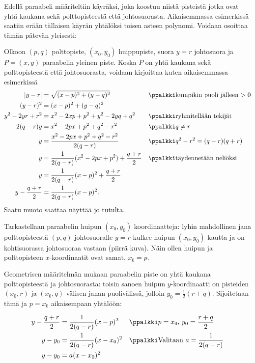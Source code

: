 Edellä paraabeli määriteltiin käyräksi, joka koostuu niistä pisteistä jotka ovat yhtä kaukana sekä polttopisteestä että johtosuorasta. Aikaisemmassa esimerkissä saatiin erään tällaisen käyrän yhtälöksi toisen asteen polynomi. Voidaan osoittaa tämän pätevän yleisesti:

Olkoon $(p,q)$ polttopiste, $(x_0, y_0)$ huippupiste, suora $y = r$ johtosuora ja $P=(x, y)$ paraabelin yleinen piste. Koska $P$ on yhtä kaukana sekä polttopisteestä että johtosuorasta, voidaan kirjoittaa kuten aikaisemmassa esimerkissä
\begin{align*}
|y-r| & = \sqrt{(x-p)^2 + (y-q)^2} &&\ppalkki \text{kumpikin puoli jälleen $>0$}\\
(y-r)^2 &= (x-p)^2 + (y-q)^2 \\
y^2 -2yr + r^2 &= x^2 -2xp + p^2 + y^2 -2yq + q^2 &&\ppalkki \text{ryhmitellään tekijät}\\
2(q-r)y &=  x^2 - 2px + p^2 +q^2 -r^2  &&\ppalkki q \not = r\\ 
y &= \frac{x^2 - 2px + p^2 +q^2 -r^2}{2(q-r)}  &&\ppalkki q^2 -r^2 = (q-r)(q+r) \\
y &= \frac{1}{2(q-r)}(x^2 - 2p x +p^2) + \frac{q+r}{2} &&\ppalkki \text{täydennetään neliöksi}\\
y &= \frac{1}{2(q-r)}(x - p)^2 + \frac{q+r}{2} \\
y - \frac{q+r}{2} &= \frac{1}{2(q-r)}(x - p)^2.
\end{align*}
Saatu muoto saattaa näyttää jo tutulta. 

Tarkastellaan paraabelin huipun $(x_0, y_0)$ koordinaatteja: lyhin mahdollinen jana polttopisteestä $(p,q)$ johtosuoralle $y =r$ kulkee huipun $(x_0, y_0)$ kautta ja on kohtisuorassa johtosuoraa vastaan (piirrä kuva). Näin ollen huipun ja polttopisteen $x$-koordinaatit ovat samat, $x_0 = p$. 

Geometrisen määritelmän mukaan paraabelin piste on yhtä kaukana polttopisteestä ja johtosuorasta: toisin sanoen huipun $y$-koordinaatti on pisteiden $(x_0, r)$ ja $(x_0, q)$ välisen janan puolivälissä, jolloin $y_0 = \frac{1}{2}(r+q)$. Sijoitetaan tämä ja $p = x_0$ aikaisempaan yhtälöön:

\begin{align*}
y - \frac{q+r}{2} &= \frac{1}{2(q-r)}(x - p)^2 &&\ppalkki p = x_0, \, y_0 = \frac{r+q}{2} \\
y -y_0 &= \frac{1}{2(q-r)}(x - x_0)^2 &&\ppalkki \text{Valitaan } a = \frac{1}{2(q-r)} \\
y - y_0 &= a(x - x_0)^2
\end{align*}

